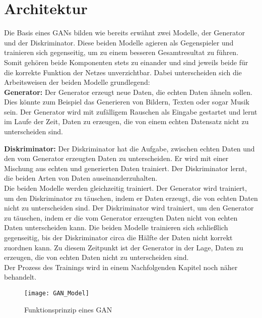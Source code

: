 \section{Architektur}

\noindent Die Basis eines \acp{GAN} bilden wie bereits erwähnt zwei Modelle, der Generator und der Diskriminator. Diese beiden Modelle agieren als Gegenspieler und trainieren sich gegenseitig, um zu einem besseren Gesamtresultat zu führen. Somit gehören beide Komponenten stets zu einander und sind jeweils beide für die korrekte Funktion der Netzes unverzichtbar. Dabei unterscheiden sich die Arbeitsweisen der beiden Modelle grundlegend: \\

\noindent \textbf{Generator:} Der Generator erzeugt neue Daten, die echten Daten ähneln sollen. Dies könnte zum Beispiel das Generieren von Bildern, Texten oder sogar Musik sein. Der Generator wird mit zufälligem Rauschen als Eingabe gestartet und lernt im Laufe der Zeit, Daten zu erzeugen, die von einem echten Datensatz nicht zu unterscheiden sind. 

\noindent \textbf{Diskriminator:} Der Diskriminator hat die Aufgabe, zwischen echten Daten und den vom Generator erzeugten Daten zu unterscheiden. Er wird mit einer Mischung aus echten und generierten Daten trainiert. Der Diskriminator lernt, die beiden Arten von Daten auseinanderzuhalten. \\

\noindent Die beiden Modelle werden gleichzeitig trainiert. Der Generator wird trainiert, um den Diskriminator zu täuschen, indem er Daten erzeugt, die von echten Daten nicht zu unterscheiden sind. Der Diskriminator wird trainiert, um den Generator zu täuschen, indem er die vom Generator erzeugten Daten nicht von echten Daten unterscheiden kann. Die beiden Modelle trainieren sich schließlich gegenseitig, bis der Diskriminator circa die Hälfte der Daten nicht korrekt zuordnen kann. Zu diesem Zeitpunkt ist der Generator in der Lage, Daten zu erzeugen, die von echten Daten nicht zu unterscheiden sind. \\

\noindent Der Prozess des Trainings wird in einem Nachfolgenden Kapitel noch näher behandelt. 

\newpage

\begin{figure}[h]
    \centering
    \texttt{[image: GAN\_Model]}
    \caption{Funktionsprinzip eines \ac{GAN}}
    \label{Abb:basic}
    \end{figure}

